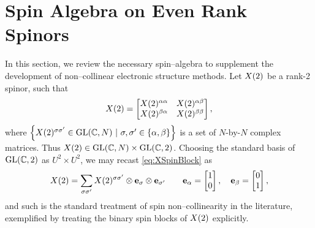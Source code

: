 \chapter{Spin Algebra on Even Rank Spinors}
\label{apx:SpinorOp}

In this section, we review the necessary spin--algebra to supplement the development of non--collinear electronic structure methods.
Let $\spinor{2}{X}$ be a rank-2 spinor, such that
\begin{equation}
\label{eq:XSpinBlock}
\spinor{2}{X} = 
  \begin{bmatrix}
    \spinor{2}{X}^{\alpha\alpha} & \spinor{2}{X}^{\alpha\beta} \\
    \spinor{2}{X}^{\beta\alpha}  & \spinor{2}{X}^{\beta\beta} \\
  \end{bmatrix}, 
\end{equation}
where $\left\lbrace\spinor{2}{X}^{\sigma\sigma'} \in \GL{C}{N}
\text{ }\vert\text{ } \sigma,\sigma' \in \{\alpha,\beta\} \right\rbrace$ is a
set of $N$-by-$N$ complex matrices. Thus $\spinor{2}{X} \in \GL{C}{N} \times \GL{C}{2}$.
Choosing the standard basis of $\GL{C}{2}$ as $U^2 \times U^2$,
we may recast \cref{eq:XSpinBlock} as
\begin{equation}
\label{eq:XSpinComp}
  \spinor{2}{X} = \sum_{\sigma\sigma'} \spinor{2}{X}^{\sigma\sigma'} \otimes \mathbf{e}_\sigma \otimes \mathbf{e}_{\sigma'} 
  \qquad 
  \mathbf{e}_\alpha = \begin{bmatrix} 1 \\ 0 \end{bmatrix}, \quad 
  \mathbf{e}_\beta  = \begin{bmatrix} 0 \\ 1 \end{bmatrix},
\end{equation}
and such is the standard treatment of spin non--collinearity in the literature, exemplified by treating the binary spin 
blocks of $\spinor{2}{X}$ explicitly.

